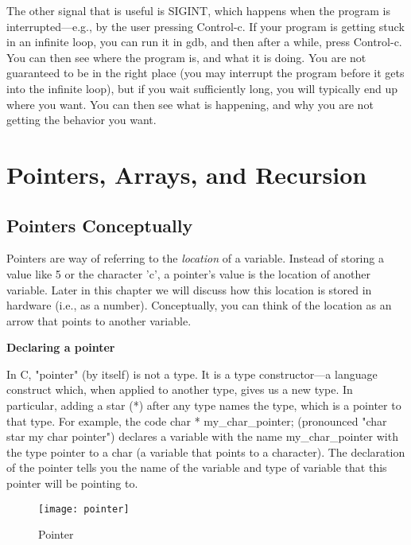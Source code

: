 \documentclass[11pt, a4paper]{article}
\begin{document}
The other signal that is useful is SIGINT, which happens when the program is interrupted—e.g., by the user pressing Control-c. If your program is getting stuck in an infinite loop, you can run it in gdb, and then after a while, press Control-c. You can then see where the program is, and what it is doing. You are not guaranteed to be in the right place (you may interrupt the program before it gets into the infinite loop), but if you wait sufficiently long, you will typically end up where you want. You can then see what is happening, and why you are not getting the behavior you want.



\section{Pointers, Arrays, and Recursion}%
\label{sec:pointers_arrays_and_recursion}


\subsection{Pointers Conceptually}%
\label{sub:pointers_conceptually}


Pointers are way of referring to the \textit{location} of a variable. Instead of storing a value like 5 or the character 'c', a pointer's value is the location of another variable. Later in this chapter we will discuss how this location is stored in hardware (i.e., as a number). Conceptually, you can think of the location as an arrow that points to another variable.

\textbf{Declaring a pointer}


In C, "pointer" (by itself) is not a type. It is a type constructor—a language construct which, when applied to another type, gives us a new type. In particular, adding a star (*) after any type names the type, which is a pointer to that type. For example, the code char * my\_char\_pointer; (pronounced "char star my char pointer") declares a variable with the name my\_char\_pointer with the type pointer to a char (a variable that points to a character). The declaration of the pointer tells you the name of the variable and type of variable that this pointer will be pointing to.



\begin{figure}[htpb]
  \centering
  \texttt{[image: pointer]}
  \caption{Pointer}
  \label{fig:pointer}
\end{figure}
\end{document}
